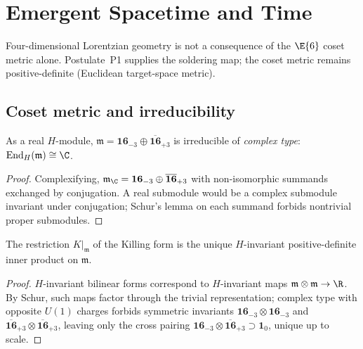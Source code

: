 \section{Emergent Spacetime and Time}
\label{sec:spacetime}

Four-dimensional Lorentzian geometry is not a consequence of the $\E{6}$
coset metric alone. Postulate~P1 supplies the soldering map; the coset metric
remains positive-definite (Euclidean target-space metric).

\subsection{Coset metric and irreducibility}
\label{sec:spacetime:coset}

\begin{theorem}\label{thm:spacetime:irrep}
As a real $H$-module, $\mathfrak{m}=\mathbf{16}_{-3}\oplus\overline{\mathbf{16}}_{+3}$
is irreducible of \emph{complex type}: $\mathrm{End}_H(\mathfrak{m})\cong\C$.
\end{theorem}

\begin{proof}
Complexifying, $\mathfrak{m}_\C=\mathbf{16}_{-3}\oplus\overline{\mathbf{16}}_{+3}$
with non-isomorphic summands exchanged by conjugation. A real submodule would
be a complex submodule invariant under conjugation; Schur's lemma on each
summand forbids nontrivial proper submodules.
\end{proof}

\begin{theorem}\label{thm:spacetime:metric}
The restriction $K|_{\mathfrak{m}}$ of the Killing form is the unique
$H$-invariant positive-definite inner product on $\mathfrak{m}$.
\end{theorem}

\begin{proof}
$H$-invariant bilinear forms correspond to $H$-invariant maps
$\mathfrak{m}\otimes\mathfrak{m}\to\R$. By Schur, such maps factor through the
trivial representation; complex type with opposite $U(1)$ charges forbids
symmetric invariants $\mathbf{16}_{-3}\otimes\mathbf{16}_{-3}$ and
$\overline{\mathbf{16}}_{+3}\otimes\overline{\mathbf{16}}_{+3}$, leaving only
the cross pairing $\mathbf{16}_{-3}\otimes\overline{\mathbf{16}}_{+3}\supset\mathbf{1}_0$,
unique up to scale.
\end{proof}

